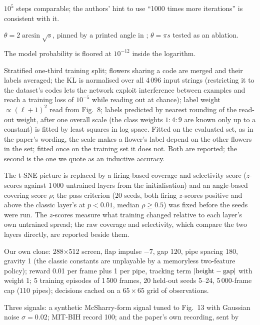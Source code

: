 \begin{description}[leftmargin=1.2em,style=nextline,itemsep=2pt]
$10^5$ steps comparable; the authors' hint to use ``1000 times more iterations'' is consistent
with it.
\item[Angle encoding (\cref{eq:encoding}).]  $\theta = 2\arcsin\sqrt s$, pinned by a printed
angle in \cite{snn}; $\theta = \pi s$ tested as an ablation.
\item[KL regularisation.]  The model probability is floored at $10^{-12}$ inside the logarithm.
\item[Iris (\cref{sec:iris}).]  Stratified one-third training split; flowers sharing a code are
merged and their labels averaged; the KL is normalised over all 4\,096 input strings (restricting
it to the dataset's codes lets the network exploit interference between examples and reach a
training loss of $10^{-5}$ while reading out at chance); label weight $\propto(\ell+1)^2$ read
from Fig.~8; labels predicted by nearest rounding of the read-out weight, after one overall
scale (the class weights $1:4:9$ are known only up to a constant) is fitted by least squares in
log space.  Fitted on the evaluated set, as in the paper's wording, the scale makes a flower's
label depend on the other flowers in the set; fitted once on the training set it does not.  Both
are reported; the second is the one we quote as an inductive accuracy.
\item[Fig.~9 criterion (\cref{sec:iris}).]  The t-SNE picture is replaced by a firing-based
coverage and selectivity score ($z$-scores against 1\,000 untrained layers from the
initialisation) and an angle-based covering score $\rho$; the pass criterion (20 seeds, both
firing $z$-scores positive and above the classic layer's at $p<0.01$, median $\rho\ge 0.5$) was
fixed before the seeds were run.  The $z$-scores measure what training changed relative to each
layer's own untrained spread; the raw coverage and selectivity, which compare the two layers
directly, are reported beside them.
\item[Flappy (\cref{sec:flappy}).]  Our own clone: 288$\times$512 screen, flap impulse $-7$, gap
120, pipe spacing 180, gravity 1 (the classic constants are unplayable by a memoryless two-feature
policy); reward 0.01 per frame plus 1 per pipe, tracking term $|{\rm height}-{\rm gap}|$ with
weight 1; 5 training episodes of 1\,500 frames, 20 held-out seeds 5--24, 5\,000-frame cap (110
pipes); decisions cached on a $65\times65$ grid of observations.
\item[ECG (\cref{sec:ecg}).]  Three signals: a synthetic McSharry-form signal tuned to Fig.~13
with Gaussian noise $\sigma = 0.02$; MIT-BIH record 100; and the paper's own recording, sent by

\end{description}
